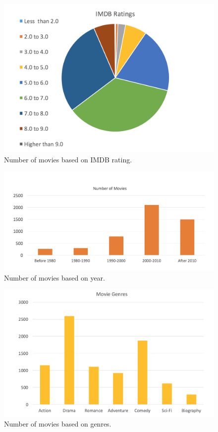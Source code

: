 \documentclass[journal,transmag]{IEEEtran}
\begin{document}
\begin{figure}

\includegraphics[scale=.5]{fig22.png}
 \caption{Number of movies based on IMDB rating.}
\label{fig1}
\end{figure}

\begin{figure}

\includegraphics[scale=.22]{fig2.png}
 \caption{Number of movies based on year.}
\label{fig2}
\end{figure}

\begin{figure}

\includegraphics[scale=.30]{fig3.png}
 \caption{Number of movies based on genres.}
\label{fig3}
\end{figure}
\end{document}
